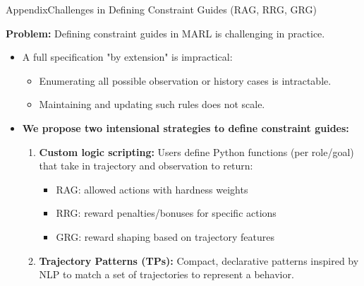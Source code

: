 \begin{frame}{Appendix}{Challenges in Defining Constraint Guides (RAG, RRG, GRG)}

\textbf{Problem:} Defining constraint guides in MARL is challenging in practice.

\begin{itemize}
  \item A full specification "by extension" is impractical:
    \begin{itemize}
      \item Enumerating all possible observation or history cases is intractable.
      \item Maintaining and updating such rules does not scale.
    \end{itemize}

  \item \textbf{We propose two intensional strategies to define constraint guides:}
  \begin{enumerate}
    \item \textbf{Custom logic scripting:} Users define Python functions (per role/goal) that take in trajectory and observation to return:
    \begin{itemize}
      \item RAG: allowed actions with hardness weights
      \item RRG: reward penalties/bonuses for specific actions
      \item GRG: reward shaping based on trajectory features
    \end{itemize}
    \item \textbf{Trajectory Patterns (TPs):} Compact, declarative patterns inspired by NLP to match a set of trajectories to represent a behavior.
  \end{enumerate}
\end{itemize}

\end{frame}


